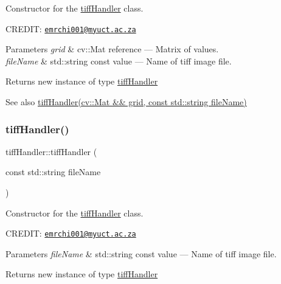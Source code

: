 Constructor for the \hyperlink{classtiffHandler}{tiff\+Handler} class. 

C\+R\+E\+D\+IT\+: \href{mailto:emrchi001@myuct.ac.za}{\tt emrchi001@myuct.\+ac.\+za}


\begin{DoxyParams}{Parameters}
{\em grid} & cv\+::\+Mat reference --- Matrix of values. \\
\hline
{\em file\+Name} & std\+::string const value --- Name of tiff image file.\\
\hline
\end{DoxyParams}
\begin{DoxyReturn}{Returns}
new instance of type \hyperlink{classtiffHandler}{tiff\+Handler}
\end{DoxyReturn}
\begin{DoxySeeAlso}{See also}
\hyperlink{classtiffHandler_a9274e4f4c7985eb580303d66e0e72cf5}{tiff\+Handler(cv\+::\+Mat \&\& grid, const std\+::string file\+Name)} 
\end{DoxySeeAlso}
\mbox{\label{classtiffHandler_a00f75f3ff7af2c7c972e7290f4797501}} 
\subsubsection{\texorpdfstring{tiff\+Handler()}{tiffHandler()}\hspace{0.1cm}{\footnotesize\ttfamily [3/5]}}
{\footnotesize\ttfamily tiff\+Handler\+::tiff\+Handler (\begin{DoxyParamCaption}\item[{const std\+::string}]{file\+Name }\end{DoxyParamCaption})}



Constructor for the \hyperlink{classtiffHandler}{tiff\+Handler} class. 

C\+R\+E\+D\+IT\+: \href{mailto:emrchi001@myuct.ac.za}{\tt emrchi001@myuct.\+ac.\+za}


\begin{DoxyParams}{Parameters}
{\em file\+Name} & std\+::string const value --- Name of tiff image file.\\
\hline
\end{DoxyParams}
\begin{DoxyReturn}{Returns}
new instance of type \hyperlink{classtiffHandler}{tiff\+Handler} 
\end{DoxyReturn}
\mbox{\label{classtiffHandler_a0c9cbb41ee7faac8dbe193e778ba2c8b}} 
